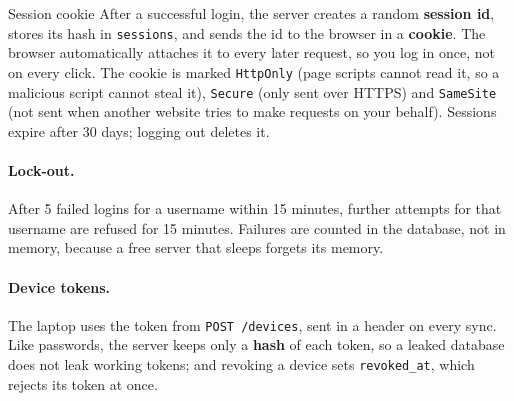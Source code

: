 \documentclass[11pt,a4paper]{article}
\begin{document}
\begin{concept}{Session cookie}
After a successful login, the server creates a random \textbf{session id}, stores its hash in
\texttt{sessions}, and sends the id to the browser in a \textbf{cookie}. The browser
automatically attaches it to every later request, so you log in once, not on every click. The
cookie is marked \texttt{HttpOnly} (page scripts cannot read it, so a malicious script cannot
steal it), \texttt{Secure} (only sent over HTTPS) and \texttt{SameSite} (not sent when another
website tries to make requests on your behalf). Sessions expire after 30 days; logging out
deletes it.
\end{concept}

\paragraph{Lock-out.} After 5 failed logins for a username within 15 minutes, further attempts
for that username are refused for 15 minutes. Failures are counted in the database, not in
memory, because a free server that sleeps forgets its memory.

\paragraph{Device tokens.} The laptop uses the token from \texttt{POST /devices}, sent in a header
on every sync. Like passwords, the server keeps only a \textbf{hash} of each token, so a leaked
database does not leak working tokens; and revoking a device sets \texttt{revoked\_at}, which
rejects its token at once.
\end{document}
